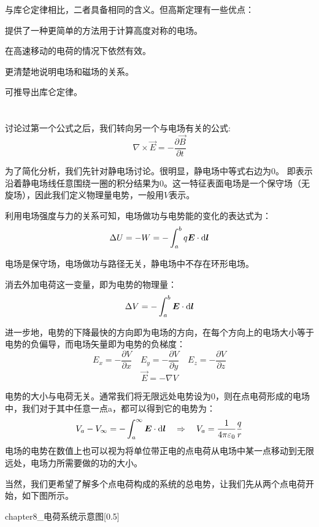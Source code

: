 与库仑定律相比，二者具备相同的含义。但高斯定理有一些优点：
\begin{Itemize}
    \item 提供了一种更简单的方法用于计算高度对称的电场。
    \item 在高速移动的电荷的情况下依然有效。
    \item 更清楚地说明电场和磁场的关系。
    \item 可推导出库仑定律。
\end{Itemize}
\section[电势]{}
讨论过第一个公式之后，我们转向另一个与电场有关的公式:
\[\nabla \times \vec{E} = -\dfrac{\partial \vec{B}}{\partial t}\]

为了简化分析，我们先针对静电场讨论。很明显，静电场中等式右边为0。
即表示沿着静电场线任意围绕一圈的积分结果为0。这一特征表面电场是一个保守场（无旋场），因此我们定义物理量电势，一般用$V$表示。

\begin{law}[电场的功能关系与电势]
    利用电场强度与力的关系可知，电场做功与电势能的变化的表达式为：
    \[\Delta U=-W=-\int_a^b q\vec{E}\cdot \dif{\vec{l}}\]

    电场是保守场，电场做功与路径无关，静电场中不存在环形电场。

    消去外加电荷这一变量，即为电势的物理量：
    \[\Delta V=-\int_a^b \vec{E}\cdot \dif{\vec{l}}\]

    进一步地，电势的下降最快的方向即为电场的方向，在每个方向上的电场大小等于电势的负偏导，而电场矢量即为电势的负梯度：
    \[E_x = -\dfrac{\partial V}{\partial x}\quad E_y = -\dfrac{\partial V}{\partial y}\quad E_z = -\dfrac{\partial V}{\partial z}\]
    \[\vec{E} = -\nabla V\]
\end{law}

电势的大小与电荷无关。通常我们将无限远处电势设为0，则在点电荷形成的电场中，我们对于其中任意一点a，都可以得到它的电势为：
\[V_a -V_{\infty}=-\int_a^{\infty} \vec{E}\cdot \dif{\vec{l}}\quad\Rightarrow\quad V_a=\dfrac{1}{4\pi\varepsilon_0}\dfrac{q}{r}\]
电场的电势在数值上也可以视为将单位带正电的点电荷从电场中某一点移动到无限远处，电场力所需要做的功的大小。

当然，我们更希望了解多个点电荷构成的系统的总电势，让我们先从两个点电荷开始，如下图所示。
\begin{singlefigure}[电荷系统示意图]{chapter8_电荷系统示意图}[0.5]
\end{singlefigure}

